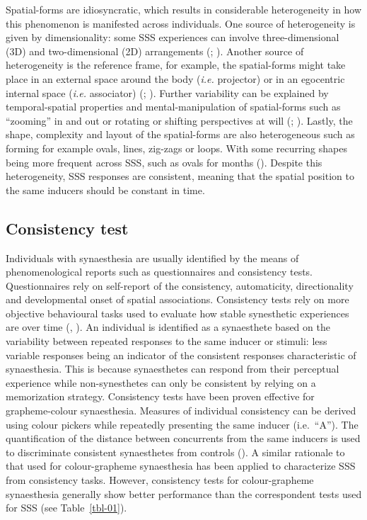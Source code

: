 \documentclass[
  man,
  floatsintext,
  longtable,
  a4paper,
  nolmodern,
  notxfonts,
  notimes,
  colorlinks=true,linkcolor=blue,citecolor=blue,urlcolor=blue]{apa7}
\begin{document}
Spatial-forms are idiosyncratic, which results in considerable
heterogeneity in how this phenomenon is manifested across individuals.
One source of heterogeneity is given by dimensionality: some SSS
experiences can involve three-dimensional (3D) and two-dimensional (2D)
arrangements (;
). Another source of
heterogeneity is the reference frame, for example, the spatial-forms
might take place in an external space around the body (\emph{i.e.}
projector) or in an egocentric internal space (\emph{i.e.} associator)
(;
). Further variability can
be explained by temporal-spatial properties and mental-manipulation of
spatial-forms such as ``zooming'' in and out or rotating or shifting
perspectives at will (;
). Lastly, the shape,
complexity and layout of the spatial-forms are also heterogeneous such
as forming for example ovals, lines, zig-zags or loops. With some
recurring shapes being more frequent across SSS, such as ovals for
months (). Despite this
heterogeneity, SSS responses are consistent, meaning that the spatial
position to the same inducers should be constant in time.

\subsection{Consistency test}\label{sec-consistency-tests}

Individuals with synaesthesia are usually identified by the means of
phenomenological reports such as questionnaires and consistency tests.
Questionnaires rely on self-report of the consistency, automaticity,
directionality and developmental onset of spatial associations.
Consistency tests rely on more objective behavioural tasks used to
evaluate how stable synesthetic experiences are over time
(,
). An individual is identified as a
synaesthete based on the variability between repeated responses to the
same inducer or stimuli: less variable responses being an indicator of
the consistent responses characteristic of synaesthesia. This is because
synaesthetes can respond from their perceptual experience while
non-synesthetes can only be consistent by relying on a memorization
strategy. Consistency tests have been proven effective for
grapheme-colour synaesthesia. Measures of individual consistency can be
derived using colour pickers while repeatedly presenting the same
inducer (i.e.~``A''). The quantification of the distance between
concurrents from the same inducers is used to discriminate consistent
synaesthetes from controls (). A similar rationale to that used for colour-grapheme
synaesthesia has been applied to characterize SSS from consistency
tasks. However, consistency tests for colour-grapheme synaesthesia
generally show better performance than the correspondent tests used for
SSS (see Table~\ref{tbl-01}).
\end{document}
